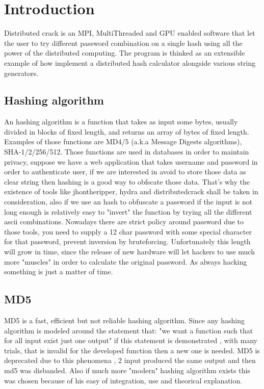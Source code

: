 \documentclass{article}
\begin{document}
\section*{Introduction}
Distributed crack is an MPI, MultiThreaded and GPU enabled software that let the user to try different password combination on a single hash using all the power of the distributed computing. The program is thinked as an extensible example of how implement a distributed hash calculator alongside various string generators.

\subsection*{Hashing algorithm}
An hashing algorithm is a function that takes as input some bytes, usually divided in blocks of fixed length, and returns an array of bytes of fixed length. Examples of those functions are MD4/5 (a.k.a Message Digests algorithms), SHA-1/2/256/512. Those functions are used in databases in order to maintain privacy, suppose we have a web application that takes username and password in order to authenticate user, if we are interested in avoid to store those data as clear string then hashing is a good way to obfscate those data. That's why the existence of tools like jhontheripper, hydra and distributedcrack shall be taken in consideration, also if we use an hash to obfuscate a password if the input is not long enough is relatively easy to "invert" the function by trying all the different ascii combinations. Nowadays there are strict policy around password due to those tools, you need to supply a 12 char password with some special character for that password, prevent inversion by bruteforcing. Unfortunately this length will grow in time, since the release of new hardware will let hackers to use much more "muscles" in order to calculate the original password. As always hacking something is just a matter of time.

\subsection*{MD5}
MD5 is a fast, efficient but not reliable hashing algorithm. Since any hashing algorithm is modeled around the statement that: "we want a function such that for all input exist just one output" if this statement is demonstrated , with many trials, that is invalid for the developed function then a new one is needed. MD5 is deprecated due to this phenomena , 2 input produced the same output and then md5 was disbanded. Also if much more "modern" hashing algorithm exists this was chosen because of his easy of integration, use and theorical explanation. 
\end{document}
